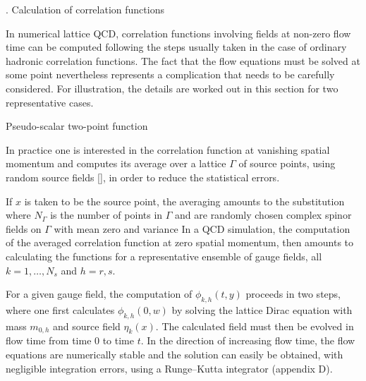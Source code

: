 

. Calculation of correlation functions

In numerical lattice QCD,
correlation functions involving fields 
at non-zero flow time can be computed
following the steps usually taken in the 
case of ordinary hadronic correlation functions.
The fact that the flow equations must be solved at 
some point nevertheless represents a complication
that needs to be carefully considered.
For illustration, the details are worked out in this section
for two representative cases.


 Pseudo-scalar two-point function

In practice one is interested in the
correlation function
at vanishing spatial momentum and computes
its average over a lattice $\Gamma$ of source points,
using random source fields [\cite{MichaelPeisa}],
in order to reduce the statistical errors.

If $x$ is taken to be
the source point, the averaging amounts to the substitution
where $N_{\Gamma}$ is the number of points in $\Gamma$ and
are randomly chosen complex spinor fields on $\Gamma$ with mean zero
and variance
In a QCD simulation,
the computation of the 
averaged correlation function at zero spatial momentum,
then amounts to calculating the functions
for a representative ensemble of gauge fields,
all $k=1,\ldots,N_s$ and $h=r,s$.

For a given gauge field,
the computation of $\phi_{k,h}(t,y)$ proceeds in two steps,
where one first calculates $\phi_{k,h}(0,w)$ by solving
the lattice Dirac equation with mass $m_{0,h}$ and
source field $\eta_k(x)$. The calculated field must then 
be evolved in flow time from time $0$ to time $t$.
In the direction of increasing flow time,
the flow equations
are numerically stable and the solution can easily 
be obtained, with negligible
integration errors, using a Runge--Kutta integrator
(appendix D). 


